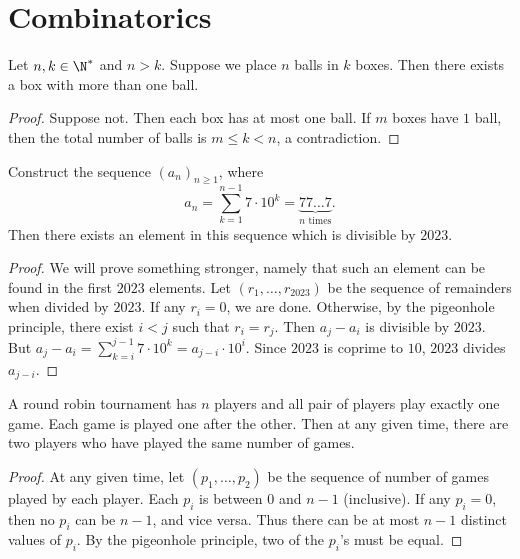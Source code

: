 
\chapter{Combinatorics}

\begin{theorem} \label{thm:php}
    Let $n, k \in \N^*$ and $n > k$.
    Suppose we place $n$ balls in $k$ boxes.
    Then there exists a box with more than one ball.
\end{theorem}
\begin{proof}
    Suppose not.
    Then each box has at most one ball.
    If $m$ boxes have $1$ ball, then the total number of balls is
    $m \le k < n$, a contradiction.
\end{proof}

\begin{example}
    Construct the sequence $(a_n)_{n \ge 1}$, where \[
        a_n = \sum_{k=1}^{n-1} 7 \cdot 10^k
            = \underbrace{77\dots7}_{n \text{ times}}.
    \] Then there exists an element in this sequence which is divisible by
    $2023$.
\end{example}
\begin{proof}
    We will prove something stronger, namely that such an element can be
    found in the first $2023$ elements.
    Let $(r_1, \dots, r_{2023})$ be the sequence of remainders when divided
    by $2023$.
    If any $r_i = 0$, we are done.
    Otherwise, by the pigeonhole principle, there exist $i < j$ such that
    $r_i = r_j$.
    Then $a_j - a_i$ is divisible by $2023$.
    But $a_j - a_i = \sum_{k=i}^{j-1} 7 \cdot 10^k = a_{j-i} \cdot 10^i$.
    Since $2023$ is coprime to $10$, $2023$ divides $a_{j-i}$.
\end{proof}

\begin{example}
    A round robin tournament has $n$ players and all pair of players play
    exactly one game.
    Each game is played one after the other.
    Then at any given time, there are two players who have played the same
    number of games.
\end{example}
\begin{proof}
    At any given time, let $(p_1, \dots, p_2)$ be the sequence of number of
    games played by each player.
    Each $p_i$ is between $0$ and $n-1$ (inclusive).
    If any $p_i = 0$, then no $p_i$ can be $n-1$, and vice versa.
    Thus there can be at most $n-1$ distinct values of $p_i$.
    By the pigeonhole principle, two of the $p_i$'s must be equal.
\end{proof}

